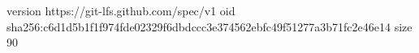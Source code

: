 version https://git-lfs.github.com/spec/v1
oid sha256:c6d1d5b1f1f974fde02329f6dbdccc3e374562ebfc49f51277a3b71fc2e46e14
size 90
